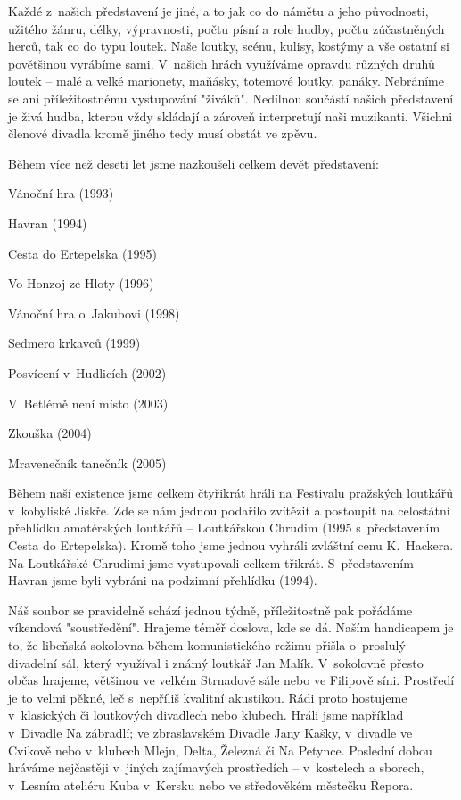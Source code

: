\documentclass[a5paper, 11pt, twoside]{article}
\begin{document}
Každé z~našich představení je jiné, a to jak co do námětu a jeho
původnosti, užitého žánru, délky, výpravnosti, počtu písní a role hudby,
počtu zúčastněných herců, tak co do typu loutek. Naše loutky, scénu,
kulisy, kostýmy a vše ostatní si povětšinou vyrábíme sami. V~našich
hrách využíváme opravdu různých druhů loutek -- malé a velké marionety,
maňásky, totemové loutky, panáky. Nebráníme se ani příležitostnému
vystupování "živáků". Nedílnou součástí našich představení je živá
hudba, kterou vždy skládají a zároveň interpretují naši muzikanti.
Všichni členové divadla kromě jiného tedy musí obstát ve zpěvu.

\smallskip
\noindent Během více než deseti let jsme nazkoušeli celkem devět představení:

\noindent Vánoční hra (1993)

\noindent Havran (1994)

\noindent Cesta do Ertepelska (1995)

\noindent Vo Honzoj ze Hloty (1996)

\noindent Vánoční hra o~Jakubovi (1998)

\noindent Sedmero krkavců (1999)

\noindent Posvícení v~Hudlicích (2002)

\noindent V~Betlémě není místo (2003)

\noindent Zkouška (2004)

\noindent Mravenečník tanečník (2005)

\smallskip

Během naší existence jsme celkem čtyřikrát hráli na Festivalu pražských
loutkářů v~kobyliské Jiskře. Zde se nám jednou podařilo zvítězit a
postoupit na celostátní přehlídku amatérských loutkářů -- Loutkářskou
Chrudim (1995 s~představením Cesta do Ertepelska). Kromě toho jsme
jednou vyhráli zvláštní cenu K.~Hackera. Na Loutkářské Chrudimi jsme
vystupovali celkem třikrát. S~představením Havran jsme byli vybráni na
podzimní přehlídku (1994).

Náš soubor se pravidelně schází jednou týdně, příležitostně pak pořádáme
víkendová "soustředění". Hrajeme téměř doslova, kde se dá. Naším
handicapem je to, že libeňská sokolovna během komunistického režimu
přišla o~proslulý divadelní sál, který využíval i známý loutkář Jan
Malík. V~sokolovně přesto občas hrajeme, většinou ve velkém Strnadově
sále nebo ve Filipově síni. Prostředí je to velmi pěkné, leč s~nepříliš
kvalitní akustikou. Rádi proto hostujeme v~klasických či loutkových
divadlech nebo klubech. Hráli jsme například v~Divadle Na zábradlí; ve
zbraslavském Divadle Jany Kašky, v~divadle ve Cvikově nebo v~klubech
Mlejn, Delta, Železná či Na Petynce. Poslední dobou hráváme nejčastěji
v~jiných zajímavých prostředích -- v~kostelech a sborech, v~Lesním
ateliéru Kuba v~Kersku nebo ve středověkém městečku Řepora.
\end{document}
